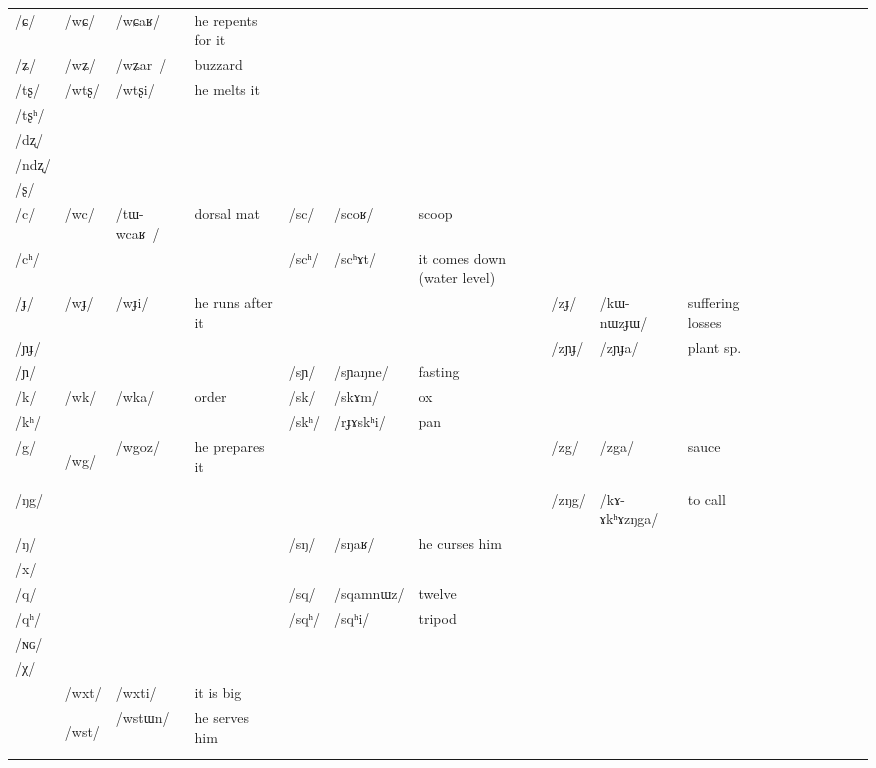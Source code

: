\documentclass[oneside,a4paper,11pt]{article}
\newcommand{\ipa}[1]{\mbox{\phon/#1/}}
\newcommand{\deux}[1]{\ipa{#1}\addtocounter{2clusters}{1}}
\newcommand{\trois}[1]{\ipa{#1}\addtocounter{3clusters}{1}}
\newcommand{\tib}[1]{\cellcolor{lightgray}\textbf{#1}}
\begin{document}
\begin{table}
{\begin{tabular}{l|lll|lll|lll|lllllll}
\ipa{ɕ}  &	\deux{wɕ}  &	\ipa{wɕaʁ}  &he repents for it&	  &	  &	&	  &	  &	&	\\	
\ipa{ʑ}  &	\deux{wʑ}  &	\ipa{wʑar }  &	buzzard&	  &	  &	&	  &	  &	&	\\
\ipa{tʂ}  &	\deux{wtʂ}  &	\ipa{wtʂi}  & he melts it	&	  &	  &	&	  &	  &	&	\\
\ipa{tʂʰ}  &	  &	  &	&	  &	  &	&	  &	  &	&	\\
\ipa{dʐ}  &	  &	  &	&	  &	  &	&	  &	  &	&	\\
\ipa{ndʐ}  &	  &	  &	&	  &	  &	&	  &	  &	&	\\
\ipa{ʂ}  &	  &	  &	&	  &	  &	&	  &	  &	&	\\
\ipa{c}  &	\deux{wc}  &	\ipa{tɯ-wcaʁ }  &dorsal mat	&	\deux{sc}  &	\ipa{scoʁ}  &scoop	&	  &	  &	&	\\
\ipa{cʰ}  &	  &	  &	&	\deux{scʰ}  &	\ipa{scʰɤt}  &	it comes down (water level)&	  &	  &	&	\\
\ipa{ɟ}  &	\deux{wɟ}  &	\ipa{wɟi}  &he runs after it	&	  &	  &	&	\deux{zɟ}  &	\ipa{kɯ-nɯzɟɯ}  &	  suffering losses&	\\
\ipa{ɲɟ}  &	  &	  &	&	  &	  &	&	\deux{zɲɟ}  &	\ipa{zɲɟa}  &	plant sp.&	\\
\ipa{ɲ}  &	  &	  &	&	\deux{sɲ}  &	\ipa{sɲaŋne}  &fasting	&	   &	 &	&	\\
\ipa{k}  &	\deux{wk}  &	\ipa{wka}  &	order&	\deux{sk}  &	\ipa{skɤm}  &	ox&	  &	  &	&	\\
\ipa{kʰ}  &	  &	  &	&	\deux{skʰ}  &	\ipa{rɟɤskʰi}  &pan	&	  &	  &	&	\\
\ipa{g}  &	\deux{wg}  \tib{}&	\ipa{wgoz}  &	he prepares it&	  &	  &	& 	\deux{zg}  &	\ipa{zga}  &	sauce&	\\
\ipa{ŋg}  &	  &	  &	&	  &	  &	&	\deux{zŋg}  &	\ipa{kɤ-ɤkʰɤzŋga}  &	to call&	\\
\ipa{ŋ}  &	  &	  &	&	\deux{sŋ}  &	\ipa{sŋaʁ}  &	he curses him&	  &	  &	&	\\
\ipa{x}  &	  &	  &	&	  &	  &	&	  &	  &	&	\\
\ipa{q}  &	  &	  &	&	\deux{sq}  &	\ipa{sqamnɯz}  &	twelve&	  &	  &	&	\\
\ipa{qʰ}  &	  &	  &	&	\deux{sqʰ}  &	\ipa{sqʰi}  &	tripod&	  &	  &	&	\\
\ipa{ɴɢ}  &	  &	  &	&	  &	  &	&	  &	  &	&	\\
\ipa{χ}  &	  &	  &	&	  &	  &	&	  &	  &	&	\\
\midrule
&	\trois{wxt}  &	\ipa{wxti}  &it is big	\\
&	\trois{wst} \tib{} &	\ipa{wstɯn}  &he serves him	\\

\end{tabular}}
\end{table}
\end{document}
